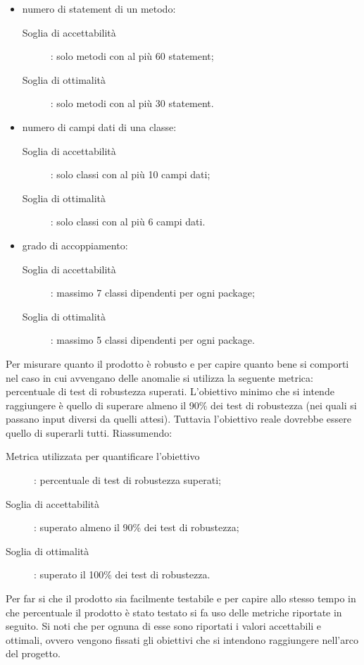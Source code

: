 					\begin{itemize}
						\item numero di statement di un metodo:
						\begin{description}
							\item[Soglia di accettabilità]: solo metodi con al più 60 statement;
							\item[Soglia di ottimalità]: solo metodi con al più 30 statement.
						\end{description}
						\item numero di campi dati di una classe:
						\begin{description}
							\item[Soglia di accettabilità]: solo classi con al più 10 campi dati;
							\item[Soglia di ottimalità]: solo classi con al più 6 campi dati.
						\end{description}
						\item grado di accoppiamento:
						\begin{description}
							\item[Soglia di accettabilità]: massimo 7 classi dipendenti per ogni package;
							\item[Soglia di ottimalità]: massimo 5 classi dipendenti per ogni package.
						\end{description}
					\end{itemize}					
					Per misurare quanto il prodotto è robusto e per capire quanto bene si comporti nel caso in cui avvengano delle anomalie si utilizza la seguente metrica: percentuale di test di robustezza superati. L'obiettivo minimo che si intende raggiungere è quello di superare almeno il 90\% dei test di robustezza (nei quali si passano input diversi da quelli attesi). Tuttavia l'obiettivo reale dovrebbe essere quello di superarli tutti. Riassumendo:
					\begin{description}
						\item[Metrica utilizzata per quantificare l'obiettivo]: percentuale di test di robustezza superati;
						\item[Soglia di accettabilità]: superato almeno il 90\% dei test di robustezza;
						\item[Soglia di ottimalità]: superato il 100\% dei test di robustezza.
					\end{description}
					Per far si che il prodotto sia facilmente testabile e per capire allo stesso tempo in che percentuale il prodotto è stato testato si fa uso delle metriche riportate in seguito. Si noti che per ognuna di esse sono riportati i valori accettabili e ottimali, ovvero vengono fissati gli obiettivi che si intendono raggiungere nell'arco del progetto.
